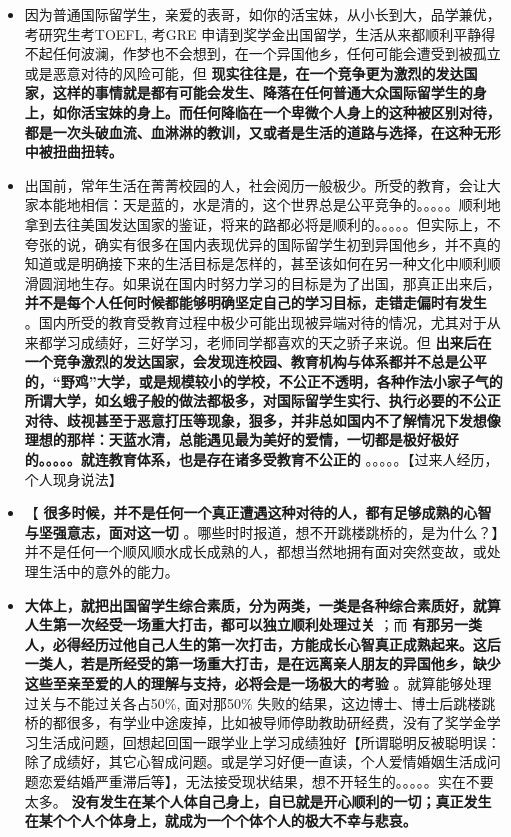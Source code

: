 \documentclass[9pt, b5paper]{article}
\begin{document}
\begin{itemize}
\begin{itemize}
\item 因为普通国际留学生，亲爱的表哥，如你的活宝妹，从小长到大，品学兼优，考研究生考TOEFL, 考GRE 申请到奖学金出国留学，生活从来都顺利平静得不起任何波澜，作梦也不会想到，在一个异国他乡，任何可能会遭受到被孤立或是恶意对待的风险可能，但 \textbf{现实往往是，在一个竞争更为激烈的发达国家，这样的事情就是都有可能会发生、降落在任何普通大众国际留学生的身上，如你活宝妹的身上。而任何降临在一个卑微个人身上的这种被区别对待，都是一次头破血流、血淋淋的教训，又或者是生活的道路与选择，在这种无形中被扭曲扭转。}
\item 出国前，常年生活在菁菁校园的人，社会阅历一般极少。所受的教育，会让大家本能地相信：天是蓝的，水是清的，这个世界总是公平竞争的。。。。。顺利地拿到去往美国发达国家的鉴证，将来的路都必将是顺利的。。。。。但实际上，不夸张的说，确实有很多在国内表现优异的国际留学生初到异国他乡，并不真的知道或是明确接下来的生活目标是怎样的，甚至该如何在另一种文化中顺利顺滑圆润地生存。如果说在国内时努力学习的目标是为了出国，那真正出来后， \textbf{并不是每个人任何时候都能够明确坚定自己的学习目标，走错走偏时有发生} 。国内所受的教育受教育过程中极少可能出现被异端对待的情况，尤其对于从来都学习成绩好，三好学习，老师同学都喜欢的天之骄子来说。但 \textbf{出来后在一个竞争激烈的发达国家，会发现连校园、教育机构与体系都并不总是公平的，“野鸡”大学，或是规模较小的学校，不公正不透明，各种作法小家子气的所谓大学，如幺蛾子般的做法都极多，对国际留学生实行、执行必要的不公正对待、歧视甚至于恶意打压等现象，狠多，并非总如国内不了解情况下发想像理想的那样：天蓝水清，总能遇见最为美好的爱情，一切都是极好极好的。。。。。就连教育体系，也是存在诸多受教育不公正的} 。。。。。【过来人经历，个人现身说法】
\item 【 \textbf{很多时候，并不是任何一个真正遭遇这种对待的人，都有足够成熟的心智与坚强意志，面对这一切} 。哪些时时报道，想不开跳楼跳桥的，是为什么？】并不是任何一个顺风顺水成长成熟的人，都想当然地拥有面对突然变故，或处理生活中的意外的能力。
\item \textbf{大体上，就把出国留学生综合素质，分为两类，一类是各种综合素质好，就算人生第一次经受一场重大打击，都可以独立顺利处理过关} ；而 \textbf{有那另一类人，必得经历过他自己人生的第一次打击，方能成长心智真正成熟起来。这后一类人，若是所经受的第一场重大打击，是在远离亲人朋友的异国他乡，缺少这些至亲至爱的人的理解与支持，必将会是一场极大的考验} 。就算能够处理过关与不能过关各占50\%, 面对那50\% 失败的结果，这边博士、博士后跳楼跳桥的都很多，有学业中途废掉，比如被导师停助教助研经费，没有了奖学金学习生活成问题，回想起回国一跟学业上学习成绩独好【所谓聪明反被聪明误：除了成绩好，其它心智成问题。或是学习好便一直读，个人爱情婚姻生活成问题恋爱结婚严重滞后等】，无法接受现状结果，想不开轻生的。。。。。实在不要太多。 \textbf{没有发生在某个人体自己身上，自已就是开心顺利的一切；真正发生在某个个人个体身上，就成为一个个体个人的极大不幸与悲哀。}

\end{itemize}
\end{itemize}
\end{document}
